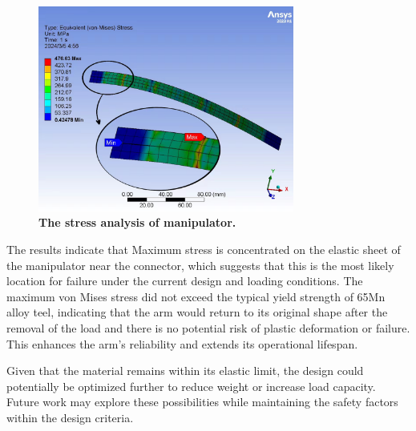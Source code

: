 \begin{itemize}
\begin{figure}[H]
        \centering 
        \captionsetup{labelsep=colon}
        \includegraphics[width=0.75\textwidth]{Image/Result/stress.jpg} 
        \caption[The stress analysis of manipulator]
        {\centering \textbf{The stress analysis of manipulator.}}
        \label{fig:stress}
    \end{figure}
\end{itemize}

The results indicate that Maximum stress is concentrated on the elastic sheet of the manipulator near the 
connector, which suggests that this is the most likely location for failure under the current design and 
loading conditions. The maximum von Mises stress did not exceed the typical yield strength of 65Mn alloy 
teel, indicating that the arm would return to its original shape after the removal of the load and there is 
no potential risk of plastic deformation or failure. This enhances the arm's reliability and extends its 
operational lifespan. 

Given that the material remains within its elastic limit, the design could potentially be optimized further 
to reduce weight or increase load capacity. Future work may explore these possibilities while maintaining 
the safety factors within the design criteria.
